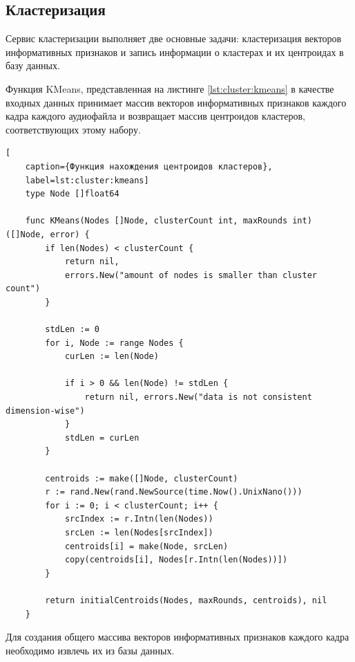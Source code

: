 
\subsection{Кластеризация}
Сервис кластеризации выполняет две основные задачи: кластеризация векторов информативных признаков и запись информации о кластерах и их центроидах в базу данных.

Функция KMeans, представленная на листинге \ref{lst:cluster:kmeans} в качестве входных данных принимает массив векторов информативных признаков каждого кадра каждого аудиофайла и возвращает массив центроидов кластеров, соответствующих этому набору.
\begin{lstlisting}[
	caption={Функция нахождения центроидов кластеров},
	label=lst:cluster:kmeans]
	type Node []float64
	
	func KMeans(Nodes []Node, clusterCount int, maxRounds int) ([]Node, error) {
		if len(Nodes) < clusterCount {
			return nil, 
			errors.New("amount of nodes is smaller than cluster count")
		}
		
		stdLen := 0
		for i, Node := range Nodes {
			curLen := len(Node)
			
			if i > 0 && len(Node) != stdLen {
				return nil, errors.New("data is not consistent dimension-wise")
			}
			stdLen = curLen
		}
		
		centroids := make([]Node, clusterCount)
		r := rand.New(rand.NewSource(time.Now().UnixNano()))
		for i := 0; i < clusterCount; i++ {
			srcIndex := r.Intn(len(Nodes))
			srcLen := len(Nodes[srcIndex])
			centroids[i] = make(Node, srcLen)
			copy(centroids[i], Nodes[r.Intn(len(Nodes))])
		}
		
		return initialCentroids(Nodes, maxRounds, centroids), nil
	}
\end{lstlisting}
Для создания общего массива векторов информативных признаков каждого кадра необходимо извлечь их из базы данных. 

